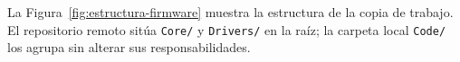 \documentclass[blue,fullpaper]{ludusofficial}  %
\begin{document}




La Figura~\ref{fig:estructura-firmware} muestra la estructura de la copia de trabajo. El repositorio remoto sitúa \texttt{Core/} y \texttt{Drivers/} en la raíz; la carpeta local \texttt{Code/} los agrupa sin alterar sus responsabilidades.
\end{document}
